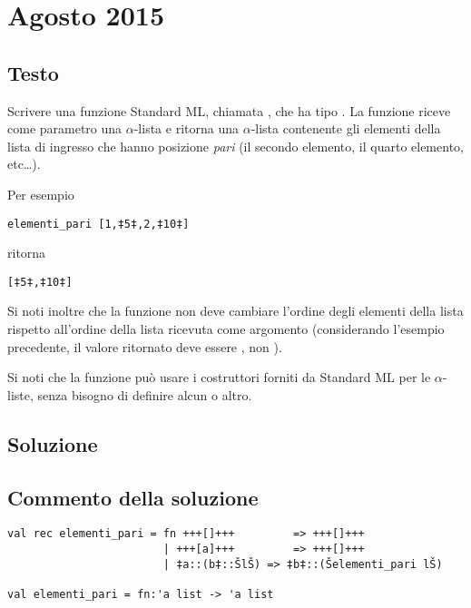 \section{Agosto 2015}

\subsection{Testo}

Scrivere una funzione Standard ML, chiamata , che ha tipo . La funzione riceve come parametro una \(\alpha\)-lista e ritorna una \(\alpha\)-lista contenente gli elementi della lista di ingresso che hanno posizione \emph{pari} (il secondo elemento, il quarto elemento, etc\dots).

\medskip
Per esempio
\begin{lstlisting}[style = SML, frame = none]
elementi_pari [1,‡5‡,2,‡10‡]
\end{lstlisting}
ritorna
\begin{lstlisting}[style = SML, frame = none]
[‡5‡,‡10‡]
\end{lstlisting}

\medskip
Si noti inoltre che la funzione  non deve cambiare l'ordine degli elementi della lista rispetto all'ordine della lista ricevuta come argomento (considerando l'esempio precedente, il valore ritornato deve essere \sml{[5,10]}, non \sml{[10,5]}).

\medskip
Si noti che la funzione  può usare i costruttori forniti da Standard ML per le \(\alpha\)-liste, senza bisogno di definire alcun  o altro.

\subsection{Soluzione}



\subsection{Commento della soluzione}

\begin{lstlisting}[style = SML, caption={Definizione della funzione \sml{elementi\_pari}}]
val rec elementi_pari = fn +++[]+++         => +++[]+++
						| +++[a]+++         => +++[]+++
						| ‡a::(b‡::ŠlŠ) => ‡b‡::(Šelementi_pari lŠ)

val elementi_pari = fn:'a list -> 'a list
\end{lstlisting}

